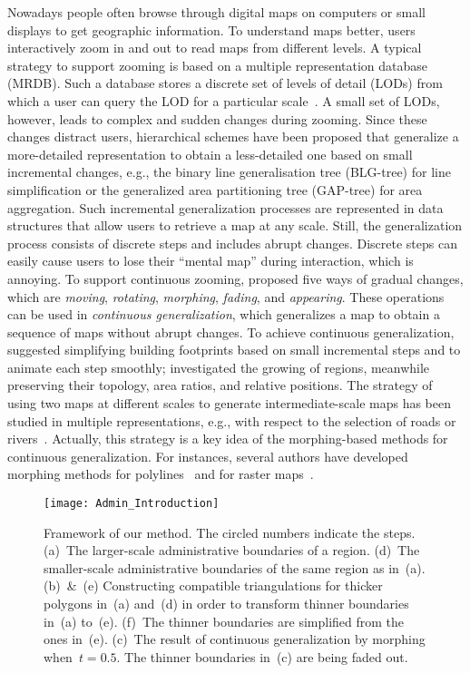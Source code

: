 Nowadays people often browse through digital maps 
on computers or small displays to get geographic information. 
To understand maps better, 
users interactively zoom in and out to read maps 
from different levels. 
A typical strategy to support zooming is based on a
multiple representation database (MRDB).  
Such a database stores a discrete set of levels of detail (LODs) 
from which a user can query the LOD for a particular 
scale~\parencite{Hampe2004multiple}. 
A small set of LODs, however, leads to 
complex and sudden changes during zooming. 
%
Since these changes distract users, 
hierarchical schemes have been proposed
that generalize a more-detailed representation to obtain a
less-detailed one based on small incremental changes, 
e.g., the binary line generalisation tree (BLG-tree)
\parencite{vanOosterom2005} 
for line simplification or
the generalized area partitioning tree (GAP-tree)
\parencite{vanOosterom1995GAPTree}
for area aggregation.  
Such incremental generalization processes are represented 
in data structures 
that allow users to retrieve a map at any scale.  
Still, the generalization process consists of discrete steps 
and includes abrupt changes.  
Discrete steps can easily cause users to lose their
``mental map'' during interaction, which is annoying. 
To support continuous zooming, 
\textcite{vanKreveld2001} proposed five ways of gradual changes, 
which are \emph{moving}, \emph{rotating}, \emph{morphing}, 
\emph{fading}, and \emph{appearing}. 
These operations can be used 
in \emph{continuous generalization},
which generalizes a map to obtain a sequence of maps 
without abrupt changes.
To achieve continuous generalization, 
\textcite{Sester2004} suggested simplifying building
footprints based on small incremental steps and 
to animate each step smoothly;
\textcite{Danciger2009} investigated the growing of regions, 
meanwhile preserving their topology, area ratios, and
relative positions. 
The strategy of using two maps at different scales
to generate intermediate-scale maps has been studied in multiple
representations, e.g., with respect to the selection of roads or
rivers~\parencite{Girres2014}. 
Actually, this strategy is a key idea of the
morphing-based methods for continuous generalization. 
For instances, several authors have developed  
morphing methods for polylines~\parencite{Cecconi2003, 
Noellenburg2008, Peng2013LSA, Schneider2015,
Peng2012River,Deng2015}
and for raster 
maps~\parencite{Reilly2004,
	Pantazis2009b}.  %


\begin{figure}[tb]	
\centering
\texttt{[image: Admin\_Introduction]}
\caption{Framework of our method.
	The circled numbers indicate the steps. 
	(a)~The larger-scale administrative boundaries of a 
	region. 
	(d)~The smaller-scale administrative boundaries of the 
	same region as in~(a). 
	(b)~\&~(e) Constructing compatible triangulations for
	thicker polygons in~(a) and~(d) in order to 
	transform thinner boundaries in~(a) to~(e).
	(f)~The thinner boundaries are simplified from the 
	ones in~(e). 
	(c)~The result of continuous generalization
	by morphing when~$t=0.5$.
	The thinner boundaries in~(c) are being faded out.
	}
\label{fig:Admin_Introduction}
\end{figure}

